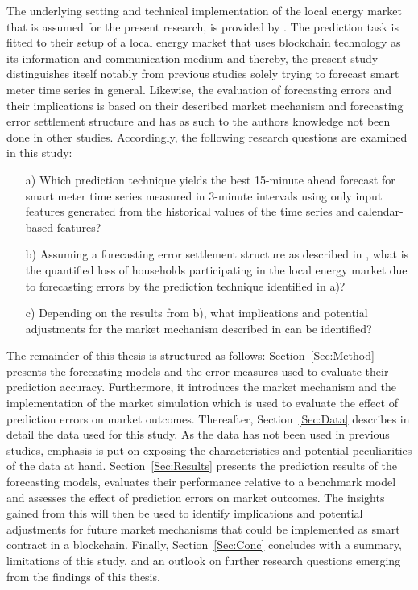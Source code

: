 The underlying setting and technical implementation of the local energy market that is assumed for the present research, is provided by \citet{Mengelkamp:2018a}. The prediction task is fitted to their setup of a local energy market that uses blockchain technology as its information and communication medium and thereby, the present study distinguishes itself notably from previous studies solely trying to forecast smart meter time series in general. Likewise, the evaluation of forecasting errors and their implications is based on their described market mechanism and forecasting error settlement structure and has as such to the authors knowledge not been done in other studies. Accordingly, the following research questions are examined in this study:
\begin{itemize}
    \item[a)] Which prediction technique yields the best 15-minute ahead forecast  for smart meter time series measured in 3-minute intervals using only input features generated from the historical values of the time series and calendar-based features?
    \item[b)] Assuming a forecasting error settlement structure as described in \citet{Mengelkamp:2018a}, what is the quantified loss of households participating in the local energy market due to forecasting errors by the prediction technique identified in a)?
    \item[c)] Depending on the results from b), what implications and potential adjustments for the market mechanism described in \citet{Mengelkamp:2018a} can be identified?
\end{itemize}

The remainder of this thesis is structured as follows: Section~\ref{Sec:Method} presents the forecasting models and the error measures used to evaluate their prediction accuracy. Furthermore, it introduces the market mechanism and the implementation of the market simulation which is used to evaluate the effect of prediction errors on market outcomes. Thereafter, Section~\ref{Sec:Data} describes in detail the data used for this study. As the data has not been used in previous studies, emphasis is put on exposing the characteristics and potential peculiarities of the data at hand. Section~\ref{Sec:Results} presents the prediction results of the forecasting models, evaluates their performance relative to a benchmark model and assesses the effect of prediction errors on market outcomes. The insights gained from this will then be used to identify implications and potential adjustments for future market mechanisms that could be implemented as smart contract in a blockchain. Finally, Section~\ref{Sec:Conc} concludes with a summary, limitations of this study, and an outlook on further research questions emerging from the findings of this thesis.


